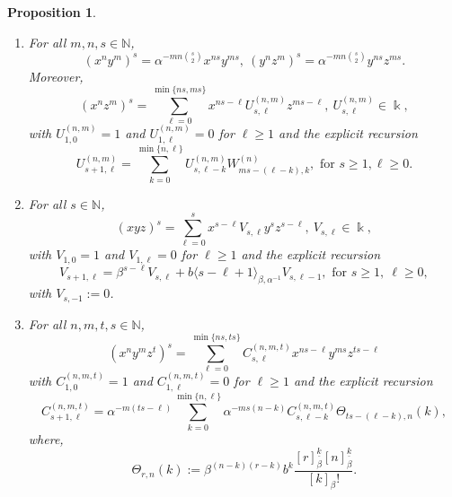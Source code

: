 \documentclass{amsart}
\newtheorem{proposition}[theorem]{Proposition}
\theoremstyle{definition}
\theoremstyle{remark}
\numberwithin{equation}{section}
\begin{document}
\begin{proposition}
\begin{enumerate}
\item[\rm (2)] For all $m,n,s\in\mathbb{N}$,
\[
(x^n y^m)^s=\alpha^{-mn\binom{s}{2}}x^{ns}y^{ms}, \ (y^n z^m)^s=\alpha^{-mn\binom{s}{2}}y^{ns}z^{ms}.
\]
Moreover, 
\begin{equation}\label{Udefcase3ii}
(x^n z^m)^s=\sum_{\ell=0}^{\min\{ns,ms\}} x^{ns-\ell}U^{(n,m)}_{s,\ell}z^{ms-\ell}, \ U^{(n,m)}_{s,\ell}\in\Bbbk,
\end{equation}
with $U^{(n,m)}_{1,0}=1$ and $U^{(n,m)}_{1,\ell}=0$ for $\ell\ge 1$ and the explicit recursion
\begin{equation}\label{Ureccase3ii}
U^{(n,m)}_{s+1,\ell}=\sum_{k=0}^{\min\{n,\ell\}}U^{(n,m)}_{s,\ell-k}W^{(n)}_{ms-(\ell-k),k}, \text{ for } s\ge 1, \ell\ge 0.
\end{equation}

\item[\rm (3)] For all $s\in\mathbb{N}$,
\begin{equation}\label{Vdefcase3ii}
(xyz)^s=\sum_{\ell=0}^{s} x^{s-\ell}V_{s,\ell}y^{s}z^{s-\ell},
\ V_{s,\ell}\in\Bbbk,
\end{equation}
with $V_{1,0}=1$ and $V_{1,\ell}=0$ for $\ell\ge 1$ and the explicit recursion
\begin{equation}\label{Vreccase3ii}
V_{s+1,\ell}=\beta^{s-\ell}V_{s,\ell}+b\langle s-\ell+1\rangle_{\beta,\alpha^{-1}}V_{s,\ell-1}, \text{ for } s\ge 1,\ \ell\ge 0,
\end{equation}
with $V_{s,-1}:=0$.

\item[\rm (4)] For all $n,m,t,s\in\mathbb{N}$, 
\begin{equation*}
(x^{n}y^{m}z^{t})^{s}=\sum_{\ell=0}^{\min\{ns,ts\}}
C^{(n,m,t)}_{s,\ell}x^{ns-\ell}y^{ms}z^{ts-\ell}
\end{equation*}
with $C^{(n,m,t)}_{1,0}=1$ and $C^{(n,m,t)}_{1,\ell}=0$ for $\ell\ge1$ and the explicit recursion
\begin{equation*}
C^{(n,m,t)}_{s+1,\ell}=\alpha^{-m(ts-\ell)}\sum_{k=0}^{\min\{n,\ell\}}
\alpha^{-ms(n-k)}C^{(n,m,t)}_{s,\ell-k}\Theta_{ts-(\ell-k),n}(k),
\end{equation*}
where,
\[
\Theta_{r,n}(k):=\beta^{(n-k)(r-k)}b^{k}\frac{[r]^{\underline{k}}_{\beta}[n]^{\underline{k}}_{\beta}}{[k]_{\beta}!}.
\]


\end{enumerate}
\end{proposition}
\end{document}
